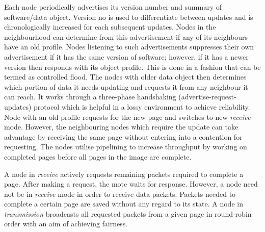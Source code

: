 \documentclass[conference,final]{IEEEtran}
\newcommand{\dme}[2]{\pdfmarkupcomment[markup=Highlight,color=yellow]{#1}{#2}}
\begin{document}
Each node periodically advertises its version number and summary of software/data object.
Version no is used to differentiate between updates and is chronologically increased for each subsequent updates.
Nodes in the neighbourhood can determine from this advertisement if any of its neighbours have an old profile. 
Nodes listening to such advertisements suppresses their own advertisement if it has the same version of software; however, if it has a newer version then responds with its object profile.
This is done in a fashion that can be termed as controlled flood.
The nodes with older data object then determines which portion of data it needs updating and requests it from any neighbour it can reach.
It works through a three-phase handshaking (advertise-request-updates) protocol which is helpful in a lossy environment to achieve reliability. 
Node with an old profile requests for the new page and switches to new \textit{receive} mode.
However, the neighbouring nodes which require the update can take advantage by receiving the same page without entering into a contention for requesting. 
The nodes utilise pipelining to increase throughput by working on completed pages before all pages in the image are complete.

A node in \textit{receive} actively requests remaining packets required to complete a page. After making a request, the mote waits for response. However, a node need not be in \textit{receive} mode in order to receive data packets.
Packets needed to complete a certain page are saved without any regard to its state.
A node in \textit{transmission} broadcasts all requested packets from a given page in round-robin order with an aim of achieving fairness.
\end{document}
